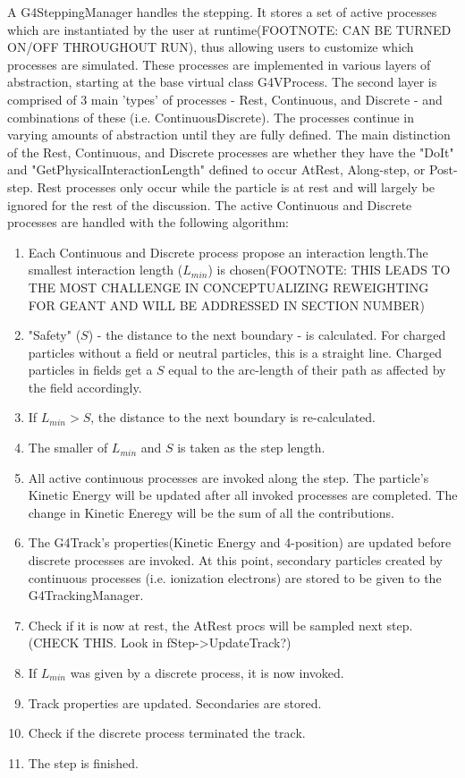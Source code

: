 \documentclass[12pt]{article}
\begin{document}
A G4SteppingManager handles the stepping. It stores a set of active processes which are instantiated by the user at runtime(FOOTNOTE: CAN BE TURNED ON/OFF THROUGHOUT RUN), thus allowing users to customize which processes are simulated. These processes are implemented in various layers of abstraction, starting at the base virtual class G4VProcess. The second layer is comprised of 3 main 'types' of processes - Rest, Continuous, and Discrete - and combinations of these (i.e. ContinuousDiscrete). The processes continue in varying amounts of abstraction until they are fully defined. The main distinction of the Rest, Continuous, and Discrete processes are whether they have the "DoIt" and "GetPhysicalInteractionLength" defined to occur AtRest, Along-step, or Post-step. Rest processes only occur while the particle is at rest and will largely be ignored for the rest of the discussion. The active Continuous and Discrete processes are handled with the following algorithm:
\begin{enumerate}
	\item Each Continuous and Discrete process propose an interaction length.The smallest interaction length ($L_{min}$) is chosen(FOOTNOTE: THIS LEADS TO THE MOST CHALLENGE IN CONCEPTUALIZING REWEIGHTING FOR GEANT AND WILL BE ADDRESSED IN SECTION NUMBER)
	\item "Safety" ($S$) - the distance to the next boundary - is calculated. For charged particles without a field or neutral particles, this is a straight line. Charged particles in fields get a $S$ equal to the arc-length of their path as affected by the field accordingly.
	\item If $L_{min} > S$, the distance to the next boundary is re-calculated. 
	\item The smaller of $L_{min}$ and $S$ is taken as the step length. 
	\item All active continuous processes are invoked along the step. The particle's Kinetic Energy will be updated after all invoked processes are completed. The change in Kinetic Eneregy will be the sum of all the contributions.
	\item The G4Track's properties(Kinetic Energy and 4-position) are updated before discrete processes are invoked. At this point, secondary particles created by continuous processes (i.e. ionization electrons) are stored to be given to the G4TrackingManager. 
	\item Check if it is now at rest, the AtRest procs will be sampled next step. (CHECK THIS. Look in fStep->UpdateTrack?)
	\item If $L_{min}$ was given by a discrete process, it is now invoked.
	\item Track properties are updated. Secondaries are stored.
	\item Check if the discrete process terminated the track.	
	\item The step is finished.
\end{enumerate}
\end{document}
